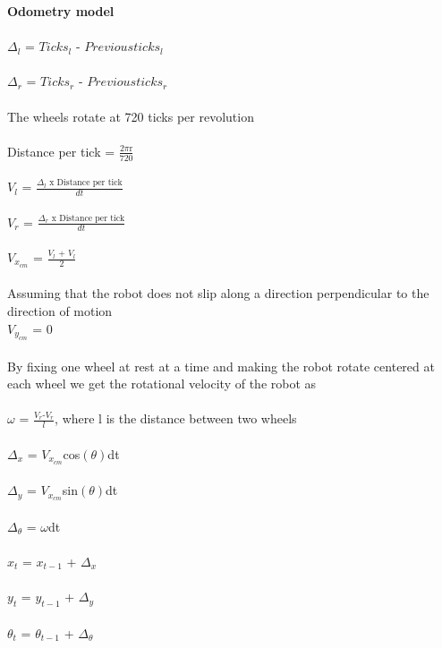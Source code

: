 \documentclass{article}
\begin{document}
\textbf{Odometry model}\\\\
$\Delta_{l}$ = $Ticks_{l}$ - $Previousticks_{l}$\\\\
$\Delta_{r}$ = $Ticks_{r}$ - $Previousticks_{r}$\\\\
The wheels rotate at 720 ticks per revolution\\\\
Distance per tick = $\frac{\text{2$\pi$r}}{720}$\\\\
$V_{l}$ = $\frac{\text{$\Delta_{l}$ x Distance per tick}}{dt}$\\\\
$V_{r}$ = $\frac{\text{$\Delta_{r}$ x Distance per tick}}{dt}$\\\\
$V_{x_{cm}}$ = $\frac{\text{$V_{l}$ + $V_{l}$}}{2}$\\\\
Assuming that the robot does not slip along a direction perpendicular to the direction of motion\\
$V_{y_{cm}}$ = 0\\\\
By fixing one wheel at rest at a time and making the robot rotate centered at each wheel we get the rotational velocity of the robot as\\\\
$\omega$ = $\frac{\text{$V_{r}$-$V_{r}$}}{l}$, where l is the distance between two wheels\\\\
$\Delta_{x}$ = $V_{x_{cm}}$cos$(\theta)$dt  \\\\
$\Delta_{y}$ = $V_{x_{cm}}$sin$(\theta)$dt \\\\
$\Delta_{\theta}$ = $\omega$dt\\\\
$x_{t}$ = $x_{t-1}$ + $\Delta_{x}$\\\\
$y_{t}$ = $y_{t-1}$ + $\Delta_{y}$\\\\
$\theta_{t}$ = $\theta_{t-1}$ + $\Delta_{\theta}$\\\\
\end{document}
